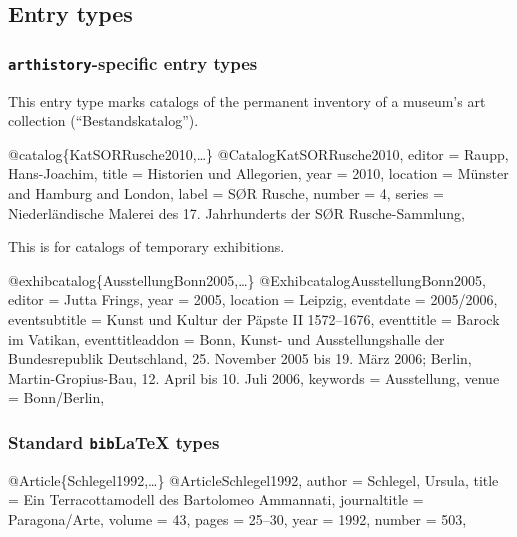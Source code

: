 \documentclass[a4paper,
10pt,
ngerman,
english
]{ltxdoc}
\begin{document}
\subsection{Entry types}


\subsubsection{\texttt{arthistory}-specific entry types}\label{sec:arth-etypes}

This entry type marks catalogs of the permanent inventory of a museum's art collection (\enquote{Bestandskatalog}).
\begin{bibexample}[label=KatSORRusche2010]{{@}catalog\{KatSORRusche2010,…\}}
@Catalog{KatSORRusche2010,
  editor   = {Raupp, Hans-Joachim},
  title    = {Historien und Allegorien},
  year     = {2010},
  location = {Münster and Hamburg and London},
  label    = {S{{\O}}R Rusche},
  number   = {4},
  series   = {Niederländische Malerei des 17. Jahrhunderts der S{{\O}}R Rusche-Sammlung},
}
\end{bibexample}

This is for catalogs of temporary exhibitions.
\begin{bibexample}[label=AusstellungBonn2005]{{@}exhibcatalog\{AusstellungBonn2005,…\}}
@Exhibcatalog{AusstellungBonn2005,
  editor          = {Jutta Frings},
  year            = {2005},
  location        = {Leipzig},
  eventdate       = {2005/2006},
  eventsubtitle   = {Kunst und Kultur der Päpste II 1572--1676},
  eventtitle      = {Barock im Vatikan},
  eventtitleaddon = {Bonn, Kunst- und Ausstellungshalle der Bundesrepublik Deutschland, 25. November 2005 bis 19. März 2006; Berlin, Martin-Gropius-Bau, 12. April bis 10. Juli 2006},
  keywords        = {Ausstellung},
  venue           = {Bonn/Berlin},
}
\end{bibexample}


\subsubsection{Standard \texttt{bib}\LaTeX{} types}

\begin{bibexample}[label=Schlegel1992]{{@}Article\{Schlegel1992,…\}}
@Article{Schlegel1992,
  author       = {Schlegel, Ursula},
  title        = {Ein Terracottamodell des Bartolomeo Ammannati},
  journaltitle = {Paragona/Arte},
  volume       = {43},
  pages        = {25--30},
  year         = {1992},
  number       = {503},
}
\end{bibexample}
\end{document}
